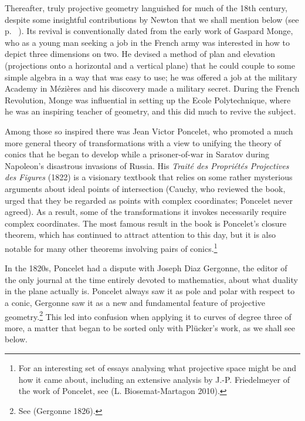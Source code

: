 \documentclass[11pt]{article}
\begin{document}
Thereafter, truly projective geometry languished for much of the 18th century, despite some insightful contributions by Newton that we shall mention below (see p. ~\pageref{Newtonconics}). Its revival is conventionally dated from the early work of Gaspard Monge, who as a young man seeking a job in the French army was  interested in how to depict three dimensions on two. He devised a method of plan and elevation (projections onto a horizontal and a vertical plane) that he could couple to some simple algebra in a way that was easy to use; he was offered a job at the military Academy in M\'ezi\`eres and his discovery made a military secret. During the French Revolution, Monge was influential in setting up the Ecole Polytechnique, where he was an inspiring teacher of geometry, and this did much to revive the subject. 

Among those so inspired there was Jean Victor Poncelet, who promoted a much more general theory of transformations with a view to unifying the theory of conics that he began to develop while a prisoner-of-war in Saratov during Napoleon's disastrous invasions of Russia. His \emph{Trait\'e des Propri\'et\'es Projectives des Figures} (1822) is a visionary textbook that relies on some rather mysterious arguments about ideal points of intersection (Cauchy, who reviewed the book, urged that they be regarded as points with complex coordinates; Poncelet never agreed). As a result, some of the transformations it invokes necessarily require complex coordinates. The most famous result in the book is Poncelet's closure theorem, which has continued to attract attention to this day, but it is also notable for many other theorems involving pairs of conics.\footnote{For an interesting  set of essays analysing what projective space might be and how it came about, including an extensive analysis by J.-P. Friedelmeyer of the work of Poncelet, see (L. Biosemat-Martagon 2010).}

In the 1820s, Poncelet had a dispute with Joseph Diaz Gergonne, the editor of the only journal at the time entirely devoted to mathematics, about what duality in the plane actually is. Poncelet always saw it as pole and polar with respect to a conic, Gergonne saw it as a new and fundamental feature of projective geometry.\footnote{See (Gergonne 1826).} This led into confusion when applying it to curves of degree three of more, a matter that began to be sorted only with Pl\"ucker's work, as we shall see below.
\end{document}
